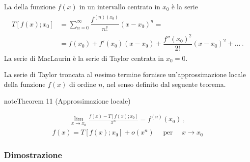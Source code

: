 \documentclass[letterpaper,10pt,italian]{jupyterBook}
\begin{document}
\sphinxAtStartPar
La  della funzione \(f(x)\) in un intervallo centrato in \(x_0\) è la serie
\begin{equation*}
\begin{split}\begin{aligned}
  T[f(x); x_0] & = \sum_{n=0}^{\infty} \dfrac{f^{(n)(x_0)}}{n!} (x-x_0)^n = \\
       & = f(x_0) + f'(x_0) (x-x_0) + \dfrac{f''(x_0)^2}{2!} (x-x_0)^2 + \dots \ .
\end{aligned}\end{split}
\end{equation*}
\sphinxAtStartPar
La serie di MacLaurin è la serie di Taylor centrata in \(x_0 = 0\).

\sphinxAtStartPar
La serie di Taylor troncata al \(n\)\sphinxhyphen{}esimo termine fornisce un’approssimazione locale della funzione \(f(x)\) di ordine \(n\), nel senso definito dal seguente teorema.
\label{ch/infinitesimal_calculus/derivatives:thm:infinitesimal-calculus:derivatives:taylor}
\begin{sphinxadmonition}{note}{Theorem 11 (Approssimazione locale)}


\begin{equation*}
\begin{split}\lim_{x \rightarrow x_0} \frac{f(x) - T[f(x); x_0]}{x^n} = f^{(n)}(x_0) \ , \end{split}
\end{equation*}\begin{equation*}
\begin{split}f(x) = T[f(x); x_0] + o(x^n) \quad \text{ per } \quad x \rightarrow x_0\end{split}
\end{equation*}\end{sphinxadmonition}
\subsubsection*{Dimostrazione}
\end{document}
